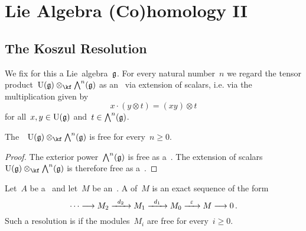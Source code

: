 \chapter{Lie Algebra (Co)homology II}
\label{lie algebra cohomology again}





\section{The Koszul Resolution}
\label{koszul resolution}

\begin{convention}
	We fix for this  a Lie~algebra~$\mathfrak{g}$.
	For every natural number~$n$ we regard the tensor product~$\Univ(\glie) \otimes_{\kf} \Exterior^n(\glie)$ as an~\module{$\Univ(\glie)$} via extension of scalars, i.e. via the multiplication given by
	\[
		x \cdot (y \otimes t)
		=
		(xy) \otimes t
	\]
	for all~$x, y \in \operatorname{U}(\mathfrak{g})$ and~$t \in \operatorname{\bigwedge}^n(\mathfrak{g})$.
\end{convention}


\begin{lemma}
	\label{extension of scalars is free}
	The~\module{$\Univ(\glie)$}~$\Univ(\glie) \otimes_{\kf} \Exterior^n(\glie)$ is free for every~$n \geq 0$.
\end{lemma}


\begin{proof}
	The exterior power~$\operatorname{\bigwedge}^n(\mathfrak{g})$ is free as a~\module{$\kf$}.
	The extension of scalars~$\Univ(\glie) \otimes_{\kf} \Exterior^n(\glie)$ is therefore free as a~\module{$\Univ(\glie)$}.
\end{proof}


\begin{recall}
	Let~$A$ be a~\algebra{$\kf$} and let~$M$ be an~.
	A  of~$M$ is an exact sequence of the form
	\[
		\dotsb
		\to
		M_2
		\xto{d_2}
		M_1
		\xto{d_1}
		M_0
		\xto{\varepsilon}
		M
		\to
		0 \,.
	\]
	Such a resolution is  if the modules~$M_i$ are free for every~$i \geq 0$.
\end{recall}


